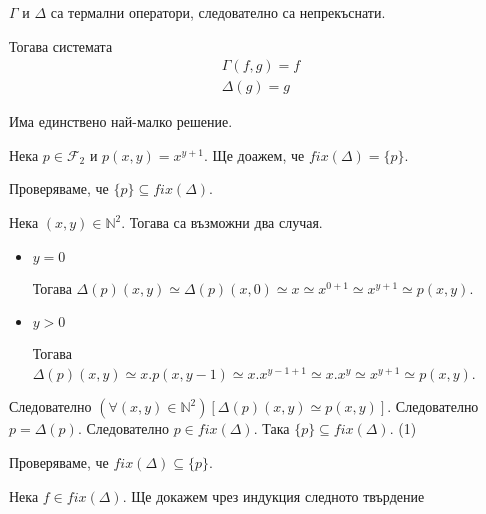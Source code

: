 \documentclass{article}
\begin{document}
\(\Gamma\) и \(\Delta\) са термални оператори, следователно са непрекъснати.

Тогава системата
\begin{align*}
\Gamma(f, g) = f \\
\Delta(g) = g
\end{align*}

Има единствено най-малко решение.

Нека \(p \in \mathcal{F}_2\) и \(p(x, y) = x^{y + 1}\).
Ще доажем, че \(fix(\Delta) = \{p\}\).

Проверяваме, че \(\{p\} \subseteq fix(\Delta)\).

Нека \((x, y) \in \mathbb{N}^2\). Тогава са възможни два случая.
\begin{itemize}
\item \(y = 0\)

Тогава \(\Delta(p)(x, y) \simeq \Delta(p)(x, 0) \simeq x \simeq x^{0 + 1} \simeq x^{y + 1} \simeq p(x, y)\).
\item \(y > 0\)

Тогава \(\Delta(p)(x, y) \simeq x.p(x, y - 1) \simeq x.x^{y - 1  + 1} \simeq x.x^y \simeq x^{y + 1} \simeq p(x, y)\).
\end{itemize}
Следователно \((\forall (x, y) \in \mathbb{N}^2)[\Delta(p)(x, y) \simeq p(x, y)]\).
Следователно \(p = \Delta(p)\).
Следователно \(p \in fix(\Delta)\). Така \(\{p\} \subseteq fix(\Delta)\). (1)

Проверяваме, че \(fix(\Delta) \subseteq \{p\}\).

Нека \(f \in fix(\Delta)\).
Ще докажем чрез индукция следното твърдение
\end{document}
